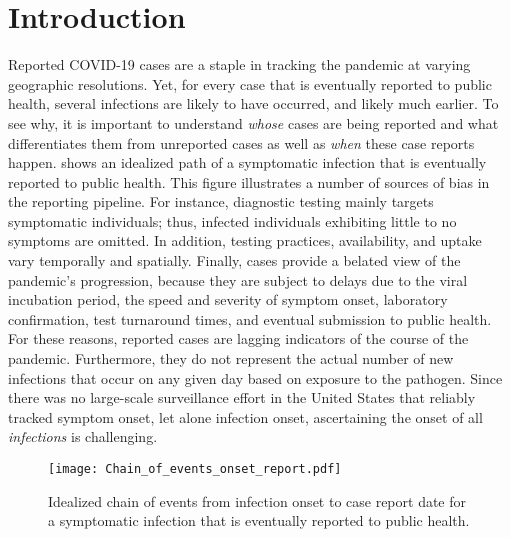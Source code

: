 \section{Introduction}
\label{sec:intro}

Reported COVID-19 cases are a staple in tracking the pandemic at varying
geographic resolutions. \citep{dong2020interactive, nyt2020corona,
wp2020tracking} Yet, for every case that is eventually reported to public
health, several infections are likely to have occurred, and likely much earlier.
To see why, it is important to understand \emph{whose} cases are being reported
and what differentiates them from unreported cases as well as \emph{when} these
case reports happen.  shows an idealized
path of a symptomatic infection that is eventually reported to public
health. This figure illustrates a number of sources of bias in the
reporting pipeline. For instance, diagnostic testing mainly targets symptomatic
individuals; thus, infected individuals exhibiting little to no symptoms are
omitted. \citep{cdc2022estimated} In addition, testing practices, availability,
and uptake vary temporally and spatially. \citep{pitzer2021impact,
ecdc2020strategies, hitchings2021usefulness} Finally, cases provide a belated
view of the pandemic's progression, because they are subject to delays due to
the viral incubation period, the speed and severity of symptom onset, laboratory
confirmation, test turnaround times, and eventual submission to public health.
\citep{pellis2021challenges, wash2020dash} For these reasons, reported cases
are lagging indicators of the course of the pandemic. Furthermore, they do not
represent the actual number of new infections that occur on any given day based on
exposure to the pathogen. Since there was no large-scale surveillance effort in
the United States that reliably tracked symptom onset, let alone infection
onset, ascertaining the onset of all \emph{infections} is challenging.

\begin{figure}[H]
\centering
    \texttt{[image: Chain\_of\_events\_onset\_report.pdf]} 
    \caption{Idealized chain of events from infection onset to case report date 
    for a symptomatic infection that is eventually reported to public health.}
    \label{fig:chain_events_onset_report}
\end{figure}


